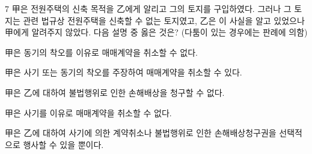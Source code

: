 \begin{question}{7}
甲은 전원주택의 신축 목적을 乙에게 알리고 그의 토지를 구입하였다. 그러나 그 토지는 관련 법규상 전원주택을 신축할 수 없는 토지였고, 乙은 이 사실을 알고 있었으나 甲에게 알려주지 않았다. 다음 설명 중 옳은 것은? (다툼이 있는 경우에는 판례에 의함)
\begin{choices}
  \item 甲은 동기의 착오를 이유로 매매계약을 취소할 수 없다.
  \item 甲은 사기 또는 동기의 착오를 주장하여 매매계약을 취소할 수 있다.
  \item 甲은 乙에 대하여 불법행위로 인한 손해배상을 청구할 수 없다.
  \item 甲은 사기를 이유로 매매계약을 취소할 수 없다.
  \item 甲은 乙에 대하여 사기에 의한 계약취소나 불법행위로 인한 손해배상청구권을 선택적으로 행사할 수 있을 뿐이다.
\end{choices}
\end{question}
